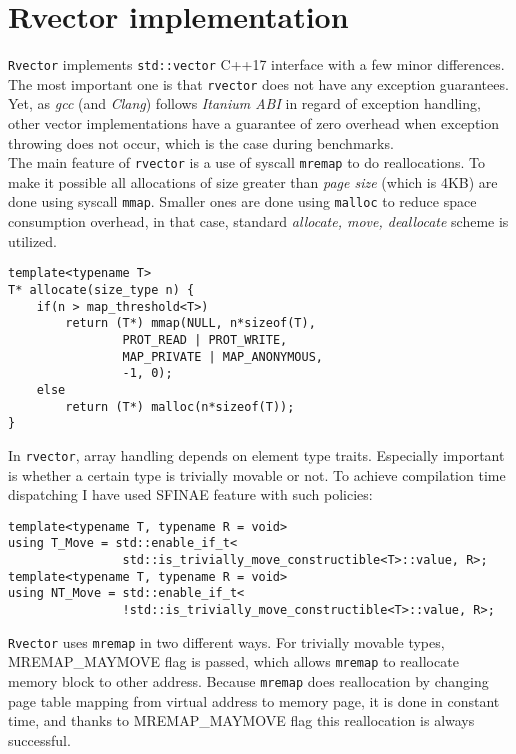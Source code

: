 \documentclass[inz, english, shortabstract]{iithesis}
\begin{document}
\chapter{Rvector implementation}
{\tt Rvector}\cite{rvector_impl} implements {\tt std::vector} C++17 interface with a few minor differences. The most important one is that {\tt rvector} does not have any exception guarantees. Yet, as \emph{gcc} (and \emph{Clang}) follows \emph{Itanium ABI}\cite{Itanium_ABI} in regard of exception handling, other vector implementations have a guarantee of zero overhead when exception throwing does not occur, which is the case during benchmarks. \\
The main feature of {\tt rvector} is a use of syscall {\tt mremap} to do reallocations. To make it possible all allocations of size greater than \emph{page size} (which is 4KB) are done using syscall {\tt mmap}. Smaller ones are done using {\tt malloc} to reduce space consumption overhead, in that case, standard \emph{allocate, move, deallocate} scheme is utilized.

\begin{lstlisting}[caption=rvector allocation]
template<typename T>
T* allocate(size_type n) {
	if(n > map_threshold<T>)
    	return (T*) mmap(NULL, n*sizeof(T), 
                PROT_READ | PROT_WRITE,
                MAP_PRIVATE | MAP_ANONYMOUS,
                -1, 0);
    else
    	return (T*) malloc(n*sizeof(T));
}
\end{lstlisting}
In {\tt rvector}, array handling depends on element type traits. Especially important is whether a certain type is trivially movable or not. To achieve compilation time dispatching I have used SFINAE feature with such policies:

\begin{lstlisting}[caption=SFINAE policies]
template<typename T, typename R = void>
using T_Move = std::enable_if_t<
				std::is_trivially_move_constructible<T>::value, R>;
template<typename T, typename R = void>
using NT_Move = std::enable_if_t<
				!std::is_trivially_move_constructible<T>::value, R>;
\end{lstlisting}
{\tt Rvector} uses {\tt mremap} in two different ways. For trivially movable types, MREMAP\_MAYMOVE flag is passed, which allows {\tt mremap} to reallocate memory block to other address. Because {\tt mremap} does reallocation by changing page table mapping from virtual address to memory page\cite{mremap}, it is done in constant time, and thanks to MREMAP\_MAYMOVE flag this reallocation is always successful. 
\end{document}
